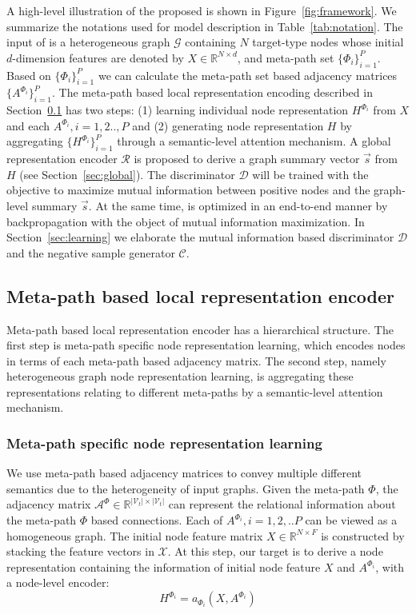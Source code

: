 \documentclass[conference]{IEEEtran}
\begin{document}
	A high-level illustration of the proposed {\our} is shown in Figure~\ref{fig:framework}. 
	We summarize the notations used for model description in Table~\ref{tab:notation}.
	The input of {\our} is a heterogeneous graph $\mathcal{G}$ containing $N$ target-type nodes whose initial $d$-dimension features are denoted by $X\in \mathbb{R}^{N\times d}$, and meta-path set $\{{\Phi_i}\}_{i=1}^P$. Based on $\{{\Phi_i}\}_{i=1}^P$ we can calculate the meta-path set based adjacency matrices $\{A^{\Phi_i}\}_{i=1}^P$.
	The meta-path based local representation encoding described in Section~\ref{sec:local} has two steps: (1) learning individual node representation $H^{\Phi_i}$ from $X$ and each $A^{\Phi_i}, i=1,2..,P$ and (2) generating node representation $H$ by aggregating $\{H^{\Phi_i}\}_{i=1}^P$ through a semantic-level attention mechanism. A global representation encoder  $\mathcal{R}$ is proposed to derive a graph summary vector $\vec{s}$ from $H$ (see Section~\ref{sec:global}). The discriminator $\mathcal{D}$ will be trained with the objective to maximize mutual information between positive nodes and the graph-level summary $\vec{s}$. At the same time, {\our} is optimized in an end-to-end manner by backpropagation with the object of mutual information maximization. In Section~\ref{sec:learning} we elaborate the mutual information based discriminator $\mathcal{D}$ and the negative sample generator $\mathcal{C}$. 
\subsection{Meta-path based local representation encoder}\label{sec:local}
Meta-path based local representation encoder has a hierarchical structure. The first step is meta-path specific node representation learning, which encodes nodes in terms of each meta-path based adjacency matrix. The second step, namely heterogeneous graph node representation learning, is aggregating these representations relating to different meta-paths by a semantic-level attention mechanism.
	\subsubsection{Meta-path specific node representation learning}
We use meta-path based adjacency matrices to convey multiple different semantics due to the heterogeneity of input graphs. Given the meta-path $\Phi$, the adjacency matrix $\mathcal{A}^{\Phi} \in \mathbb{R}^{|\mathcal{V}_t|\times |\mathcal{V}_t|}$ can represent the relational information about the meta-path $\Phi$ based connections.
Each of $A^{\Phi_i}, i=1,2,..P$ can be viewed as a homogeneous graph. 
	The initial node feature matrix $X \in \mathbb{R}^{N \times F}$ is constructed by stacking the feature vectors in $\mathcal{X} $. 
	At this step, our target is to derive a node representation containing the information of initial node feature $X$ and $A^{\Phi_i}$, with a node-level encoder:
\begin{equation}
		H^{\Phi_i}=	a_{\Phi_i}(X, A^{\Phi_i})
\end{equation}
\end{document}
